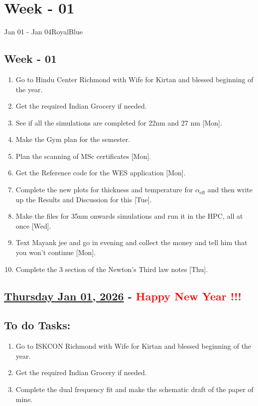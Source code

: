 \section{Week - 01 }
\begin{physicsmodule}{Jan 01 - Jan 04}{RoyalBlue}
  \begin{lawbox}
    \subsection*{\sffamily\bfseries \textbf{Week - 01}}
    \begin{enumerate}
    \item Go to Hindu Center Richmond with Wife for Kirtan and blessed beginning of the year. \cmark  
    \item Get the required Indian Grocery if needed. \cmark
    \item See if all the simulations are completed for 22nm and 27 nm [Mon]. 
    \item Make the Gym plan for the semester. \cmark
    \item Plan the scanning of MSc certificates [Mon]. 
    \item Get the Reference code for the WES application [Mon].
    \item Complete the new plots for thickness and temperature for $\alpha_{\mathrm{eff}}$ and then write up the Results and Discussion for this [Tue].
    \item Make the files for 35nm onwards simulations and run it in the HPC, all at once [Wed].
    \item Text Mayank jee and go in evening and collect the money and tell him that you won't continue [Mon].
    \item Complete the 3 section of the Newton's Third law notes [Thu].    
\end{enumerate}
  \end{lawbox}
\end{physicsmodule}
\subsection*{\underline{Thursday Jan 01, 2026} -  \textcolor{red}{\Large{Happy New Year !!!}}}
\subsection*{To do Tasks:}
\begin{enumerate}
    \item Go to ISKCON Richmond with Wife for Kirtan and blessed beginning of the year. 
    \item Get the required Indian Grocery if needed.
    \item Complete the dual frequency fit and make the schematic draft of the paper of mine. 
\end{enumerate}
